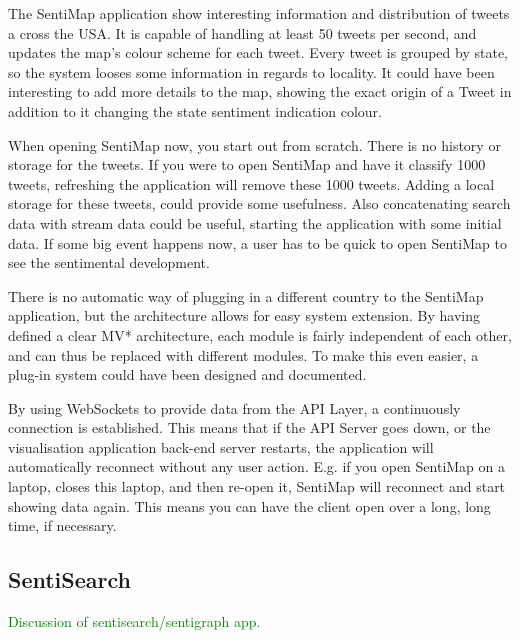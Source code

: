 The SentiMap application show interesting information and distribution of tweets a cross the USA. It is capable of handling at least 50 tweets per second, and updates the map's colour scheme for each tweet. Every tweet is grouped by state, so the system looses some information in regards to locality. It could have been interesting to add more details to the map, showing the exact origin of a Tweet in addition to it changing the state sentiment indication colour.

When opening SentiMap now, you start out from scratch. There is no history or storage for the tweets. If you were to open SentiMap and have it classify 1000 tweets, refreshing the application will remove these 1000 tweets. Adding a local storage for these tweets, could provide some usefulness. Also concatenating search data with stream data could be useful, starting the application with some initial data. If some big event happens now, a user has to be quick to open SentiMap to see the sentimental development. 

There is no automatic way of plugging in a different country to the SentiMap application, but the architecture allows for easy system extension. By having defined a clear MV* architecture, each module is fairly independent of each other, and can thus be replaced with different modules. To make this even easier, a plug-in system could have been designed and documented. 

By using WebSockets to provide data from the API Layer, a continuously connection is established. This means that if the API Server goes down, or the visualisation application back-end server restarts, the application will automatically reconnect without any user action. E.g. if you open SentiMap on a laptop, closes this laptop, and then re-open it, SentiMap will reconnect and start showing data again. This means you can have the client open over a long, long time, if necessary.   

\subsection{SentiSearch}

\textcolor{green}{Discussion of sentisearch/sentigraph app.}


